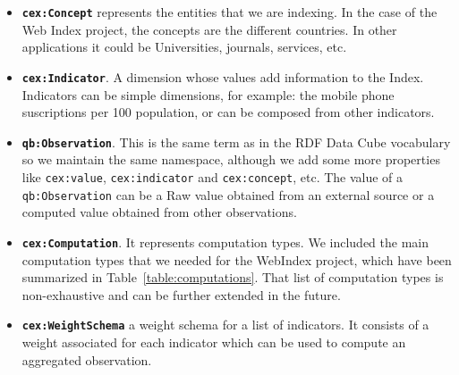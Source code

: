 \documentclass{llncs}
\begin{document}
\begin{itemize}
\item\textbf{\lstinline|cex:Concept|} represents the entities that we are
indexing.
In the case of the Web Index project, the concepts are the different countries.
In other applications it could be Universities, journals, services, etc.

\item\textbf{\lstinline|cex:Indicator|}. A dimension whose values add
information to the Index.
Indicators can be simple dimensions, for example: the mobile phone
suscriptions per 100 population, or can be composed from other
indicators. 

\item\textbf{\lstinline|qb:Observation|}. This is the same term as in the 
RDF Data Cube vocabulary so we maintain the same namespace, although we add some more properties like \lstinline|cex:value|, \lstinline|cex:indicator| 
and \lstinline|cex:concept|, etc. 
The value of a \lstinline|qb:Observation| can be a Raw value
   obtained from an external source or a computed value obtained from other
   observations.

\item\textbf{\lstinline|cex:Computation|}. It represents computation
types. We included the main computation types that we needed for the WebIndex project, which have been summarized in
Table~\ref{table:computations}. That list of computation types is non-exhaustive
and can be further extended in the future. 

\item\textbf{\lstinline|cex:WeightSchema|} a weight schema for a list of
indicators. It consists of a weight associated for each indicator which can be
used to compute an aggregated observation.

\end{itemize}
\end{document}
